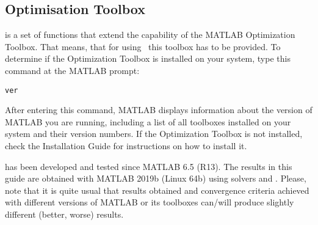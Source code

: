 \subsection{Optimisation Toolbox}
 is a set of functions that extend the capability of the
MATLAB Optimization Toolbox. That means, that for using~
this toolbox has to be provided. To determine if the Optimization
Toolbox is installed on your system, type this command at the MATLAB
prompt:
\begin{verbatim}
ver
\end{verbatim}
After entering this command, MATLAB displays information about the
version of MATLAB you are running, including a list of all toolboxes
installed on your system and their version numbers.  If the
Optimization Toolbox is not installed, check the Installation Guide
for instructions on how to install it.

 has been developed and tested since MATLAB 6.5 (R13). The
results in this guide are obtained with MATLAB 2019b (Linux 64b) using
solvers  and . Please, note that it is quite
usual that results obtained and convergence criteria achieved with
different versions of MATLAB or its toolboxes can/will produce
slightly different (better, worse) results.


